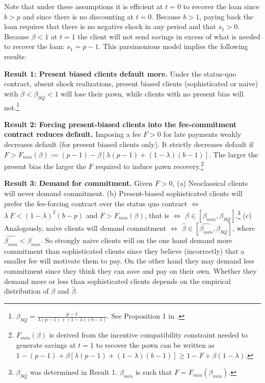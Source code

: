 \documentclass[oneside,11pt]{article}
\begin{document}
Note that under these assumptions it is efficient at $t=0$ to recover the loan since $b>p$ and since there is no discounting at $t=0$. Because $b>1$, paying back the loan requires that there is no negative shock in any period and that $s_1>0$. Because $\beta<1$ at $t=1$ the client will not send savings in excess of what is needed to recover the loan: $s_1=p-1$. This parsimonious model implies the following results:

\vspace{.2in}
\noindent \textbf{Result 1: Present biased clients default more.} Under the status-quo contract, absent shock realizations, present biased clients (sophisticated or naive) with $\beta<\beta_{SQ}<1$ will lose their pawn, while clients with no present bias will not.\footnote{$\beta_{SQ}=\frac{p-1}{\lambda(p-1)+(1-\lambda)(b-1)}$. See Proposition 1 in \cite{John}.} 

\vspace{.1in}
\noindent \textbf{Result 2: Forcing present-biased clients into the fee-commitment contract reduces default.} Imposing a fee $F>0$ for late payments weakly decreases default (for present biased clients only). It strictly decreases default if $F>F_{min}(\beta):=(p-1)-\beta[\lambda(p-1)+(1-\lambda)(b-1)]$. The larger the present bias the larger the $F$ required to induce pawn recovery.\footnote{$F_{min}(\beta)$ is derived from the incentive compatibility constraint needed to generate savings at $t=1$ to recover the pawn can be written as $1-(p-1)+\beta[\lambda(p-1)+(1-\lambda)(b-1)] \geq 1-F+\beta(1-\lambda)$.}

\vspace{.1in}
\noindent \textbf{Result 3: Demand for commitment.} Given $F>0$, (a) Neoclassical clients will never demand commitment. (b) Present-biased sophisticated clients will prefer the fee-forcing contract over the status quo contract $\iff$  $\lambda \: F<(1-\lambda)^2(b-p)$ and $F>F_{min}(\beta)$, that is $\iff$  $\beta \in [\beta_{min},\beta_{SQ}]$.\footnote{$\beta_{SQ}$ was determined in Result 1. $\beta_{min}$ is such that $F=F_{min}(\beta_{min})$.} (c) Analogously, naive clients will demand commitment $\iff$ $\hat{\beta} \in [\widehat{\beta_{min}},\beta_{SQ}]$, where $\widehat{\beta_{min}}<\beta_{min}$. So strongly naive clients will on the one hand demand more commitment than sophisticated clients since they believe (incorrectly) that a smaller fee will motivate them to pay. On the other hand they may demand less commitment since they think they can save and pay on their own. Whether they demand more or less than sophisticated clients depends on the empirical distribution of $\beta$ and $\hat{\beta}$. 
\end{document}
